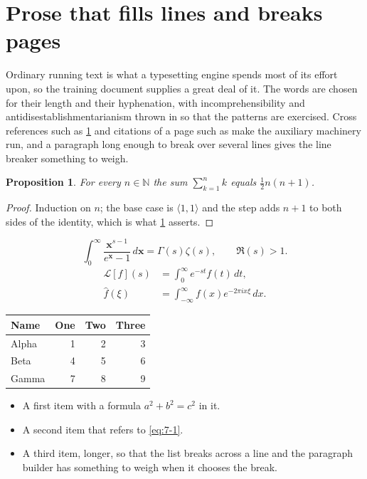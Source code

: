 \documentclass[11pt,a4paper]{report}
\theoremstyle{plain}
\newtheorem{proposition}{Proposition}[chapter]
\newcommand{\vecn}[1]{\mathbf{#1}}
\newcommand{\pairs}[2]{\langle #1,#2\rangle}
\begin{document}
\section{Prose that fills lines and breaks pages}
\label{sec:prose7-1}
Ordinary running text is what a typesetting engine spends most of its effort
upon, so the training document supplies a great deal of it. The words are
chosen for their length and their hyphenation, with incomprehensibility and
antidisestablishmentarianism thrown in so that the patterns are exercised.
Cross references such as \cref{sec:prose7-1} and citations of a page such
as \pageref{sec:prose7-1} make the auxiliary machinery run, and a
paragraph long enough to break over several lines gives the line breaker
something to weigh.
\begin{proposition}\label{prop:7-1}
For every $n\in\mathbb{N}$ the sum $\sum_{k=1}^{n}k$ equals
$\tfrac{1}{2}n(n+1)$.
\end{proposition}
\begin{proof}
Induction on $n$; the base case is $\pairs{1}{1}$ and the step adds $n+1$ to
both sides of the identity, which is what \cref{prop:7-1} asserts.
\end{proof}
\begin{equation}\label{eq:7-1}
  \int_{0}^{\infty}\frac{\vecn{x}^{s-1}}{e^{\vecn{x}}-1}\,d\vecn{x}
    = \Gamma(s)\zeta(s),\qquad \Re(s)>1 .
\end{equation}
\begin{align}
  \mathcal{L}[f](s) &= \int_{0}^{\infty} e^{-st} f(t)\,dt, \\
  \widehat{f}(\xi)  &= \int_{-\infty}^{\infty} f(x) e^{-2\pi i x\xi}\,dx .
\end{align}
\par\noindent\begin{center}
\begin{tabular}{lrrr}
\hline
Name & One & Two & Three \\
\hline
Alpha & 1 & 2 & 3 \\
Beta & 4 & 5 & 6 \\
Gamma & 7 & 8 & 9 \\
\hline
\end{tabular}
\end{center}
\begin{itemize}
  \item A first item with a formula $a^2+b^2=c^2$ in it.
  \item A second item that refers to \eqref{eq:7-1}.
  \item A third item, longer, so that the list breaks across a line and the
    paragraph builder has something to weigh when it chooses the break.
\end{itemize}
\end{document}
